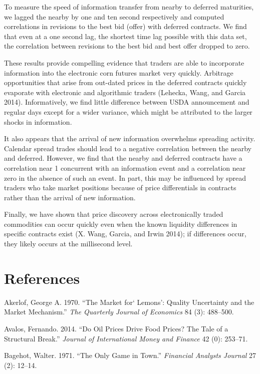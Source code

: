 \documentclass[review,12pt]{elsarticle}
\begin{document}
To measure the speed of information transfer from nearby to deferred
maturities, we lagged the nearby by one and ten second respectively and
computed correlations in revisions to the best bid (offer) with deferred
contracts. We find that even at a one second lag, the shortest time lag
possible with this data set, the correlation between revisions to the
best bid and best offer dropped to zero.

These results provide compelling evidence that traders are able to
incorporate information into the electronic corn futures market very
quickly. Arbitrage opportunities that arise from out-dated prices in the
deferred contracts quickly evaporate with electronic and algorithmic
traders (Lehecka, Wang, and Garcia 2014). Informatively, we find little
difference between USDA announcement and regular days except for a wider
variance, which might be attributed to the larger shocks in information.

It also appears that the arrival of new information overwhelms spreading
activity. Calendar spread trades should lead to a negative correlation
between the nearby and deferred. However, we find that the nearby and
deferred contracts have a correlation near 1 concurrent with an
information event and a correlation near zero in the absence of such an
event. In part, this may be influenced by spread traders who take market
positions because of price differentials in contracts rather than the
arrival of new information.

Finally, we have shown that price discovery across electronically traded
commodities can occur quickly even when the known liquidity differences
in specific contracts exist (X. Wang, Garcia, and Irwin 2014); if
differences occur, they likely occurs at the millisecond level.

\section*{References}\label{references}

Akerlof, George A. 1970. ``The Market for` Lemons': Quality Uncertainty
and the Market Mechanism.'' \emph{The Quarterly Journal of Economics} 84
(3): 488--500.

Avalos, Fernando. 2014. ``Do Oil Prices Drive Food Prices? The Tale of a
Structural Break.'' \emph{Journal of International Money and Finance} 42
(0): 253--71.

Bagehot, Walter. 1971. ``The Only Game in Town.'' \emph{Financial
Analysts Journal} 27 (2): 12--14.
\end{document}
